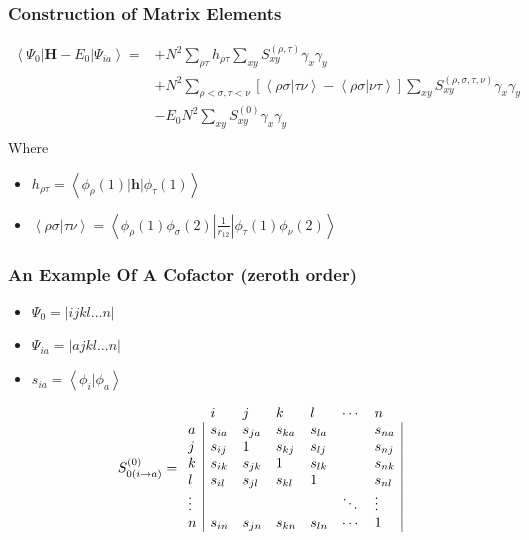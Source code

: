 \documentclass[]{beamer}
\begin{document}
\begin{frame}
  \frametitle{Construction of Matrix Elements}
  \begin{equation*}
    \begin{split}
      \left < \Psi_0 | \mathbf{H} - E_0 | \Psi_{ia} \right>= & + N^2 \sum_{\rho\tau} h_{\rho\tau} \sum_{xy} S_{xy}^{(\rho,\tau)}\gamma_x\gamma_y \\
      & + N^2 \sum_{\rho<\sigma,\tau<\nu} [\left <\rho\sigma|\tau\nu \right > - \left < \rho\sigma | \nu\tau \right> ] \sum_{xy} S_{xy}^{(\rho,\sigma,\tau,\nu)}\gamma_x\gamma_y \\
      &  - E_0 N^2 \sum_{xy} S_{xy}^{(0)}\gamma_x\gamma_y \\
    \end{split}
  \end{equation*}
  Where
  \begin{itemize}
    \item {$h_{\rho\tau} = \left< \phi_\rho(1) | \mathbf{h} | \phi_\tau(1) \right>$}
    \item {$\left<\rho\sigma | \tau\nu \right> = \left<\phi_\rho(1)\phi_\sigma(2) | \frac{1}{r_{12}} | \phi_\tau(1)\phi_\nu(2) \right>$}
  \end{itemize} 
\end{frame}

\begin{frame}
  \frametitle{An Example Of A Cofactor (zeroth order)}
  \begin{itemize}
    \item $\Psi_0 = |ijkl...n|$
    \item $\Psi_{ia} = |ajkl...n|$
    \item $s_{ia} = \left< \phi_i | \phi_a \right>$
  \end{itemize}
  \begin{equation*}
S_{0(i \rightarrow a)}^{(0)}=
\begin{array}{lllllll}
 &  i & j & k & l & \cdots & n \\
 a &  \multicolumn{1}{|l}{s_{ia}} & s_{ja}  & s_{ka} & s_{la} & & \multicolumn{1}{l|}{ s_{na} } \\
 j & \multicolumn{1}{|l}{s_{ij}} & 1 & s_{kj} & s_{lj} & & \multicolumn{1}{l|}{s_{nj}} \\
 k & \multicolumn{1}{|l}{s_{ik}} & s_{jk} & 1 & s_{lk} & & \multicolumn{1}{l|}{s_{nk}} \\
 l & \multicolumn{1}{|l}{s_{il}} & s_{jl} & s_{kl} & 1 & & \multicolumn{1}{l|}{s_{nl}} \\
 \vdots & \multicolumn{1}{|l}{ } &   &   & & \ddots & \multicolumn{1}{l|}{\vdots} \\
 n & \multicolumn{1}{|l}{ s_{in}} & s_{jn} & s_{kn} & s_{ln} & \cdots & \multicolumn{1}{l|}{1}
\end{array}
  \end{equation*}
\end{frame}
\end{document}
